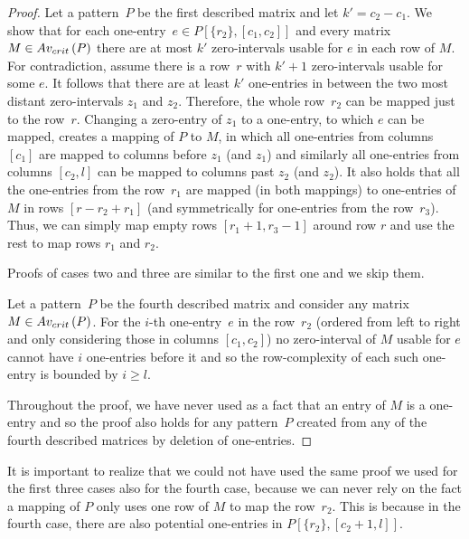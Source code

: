 \begin{proof}
Let a pattern~$P$ be the first described matrix and let $k'=c_2-c_1$. We show that for each one-entry~$e\in P[\{r_2\},[c_1,c_2]]$ and every matrix~$M\in Av_{crit}\left(P\right)$ there are at most $k'$ zero-intervals usable for $e$ in each row of $M$. For contradiction, assume there is a row~$r$ with $k'+1$ zero-intervals usable for some $e$. It follows that there are at least $k'$ one-entries in between the two most distant zero-intervals $z_1$ and $z_2$. Therefore, the whole row~$r_2$ can be mapped just to the row~$r$. Changing a zero-entry of $z_1$ to a one-entry, to which $e$ can be mapped, creates a mapping of $P$ to $M$, in which all one-entries from columns $[c_1]$ are mapped to columns before $z_1$ (and $z_1$) and similarly all one-entries from columns $[c_2,l]$ can be mapped to columns past $z_2$ (and $z_2$). It also holds that all the one-entries from the row~$r_1$ are mapped (in both mappings) to one-entries of $M$ in rows $[r-r_2+r_1]$ (and symmetrically for one-entries from the row~$r_3$). Thus, we can simply map empty rows $[r_1+1,r_3-1]$ around row $r$ and use the rest to map rows $r_1$ and $r_2$.

Proofs of cases two and three are similar to the first one and we skip them.

Let a pattern~$P$ be the fourth described matrix and consider any matrix~$M\in Av_{crit}\left(P\right)$. For the $i$-th one-entry~$e$ in the row~$r_2$ (ordered from left to right and only considering those in columns $[c_1,c_2]$) no zero-interval of $M$ usable for $e$ cannot have $i$ one-entries before it and so the row-complexity of each such one-entry is bounded by $i\geq l$.

Throughout the proof, we have never used as a fact that an entry of $M$ is a one-entry and so the proof also holds for any pattern~$P$ created from any of the fourth described matrices by deletion of one-entries.
\end{proof}

It is important to realize that we could not have used the same proof we used for the first three cases also for the fourth case, because we can never rely on the fact a mapping of $P$ only uses one row of $M$ to map the row~$r_2$. This is because in the fourth case, there are also potential one-entries in $P[\{r_2\},[c_2+1,l]]$.

